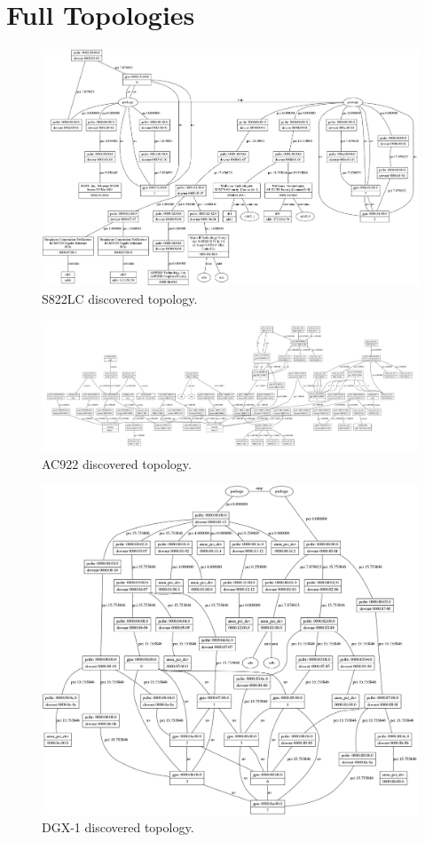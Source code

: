 \chapter{Full Topologies}
\label{ch:full-topos}


\begin{figure}[ht]
    \centering
    \includegraphics[width=\textwidth]{figures/topo-minsky-actual.png}
    \caption{S822LC discovered topology.}
    \label{fig:topo-minsky-actual}
\end{figure}

\begin{figure}[ht]
    \centering
    \includegraphics[width=\textwidth]{figures/topo-ac922-actual.pdf}
    \caption{AC922 discovered topology.}
    \label{fig:topo-ac922-actual}
\end{figure}

\begin{figure}[ht]
    \centering
    \includegraphics[width=\textwidth]{figures/topo-dgx1-actual.png}
    \caption{DGX-1 discovered topology.}
    \label{fig:topo-dgx-actual}
\end{figure}
